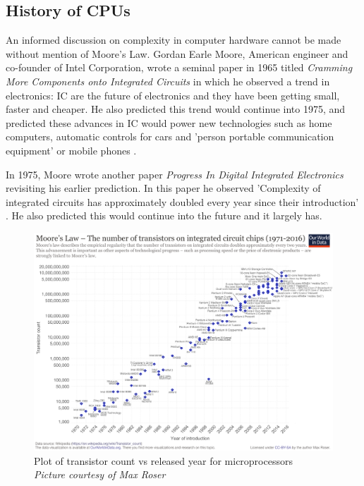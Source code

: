\subsection{History of CPUs}
An informed discussion on complexity in computer hardware cannot be made without mention of Moore's Law.  Gordan Earle Moore, American engineer and co-founder of Intel Corporation, wrote a seminal paper in 1965 titled \textit{Cramming  More  Components  onto Integrated  Circuits} in which he observed a trend in electronics: IC are the future of electronics and they have been getting small, faster and cheaper. He also predicted this trend would continue into 1975, and predicted these advances in IC would power new technologies such as home computers, automatic controls for cars and 'person portable communication equipment' or mobile phones \cite{moore65}.

In 1975, Moore wrote another paper \textit{Progress In Digital Integrated Electronics} revisiting his earlier prediction. In this paper he observed 'Complexity of integrated circuits has approximately doubled every year since their introduction' \cite{moore75}. He also predicted this would continue into the future and it largely has. 

\begin{figure} \begin{center}
\includegraphics[width=1\linewidth]{pics/moore_law} 
\end{center} 
\caption{Plot of transistor count vs released year for microprocessors\\ \textit{\small{Picture courtesy of  Max Roser}}}
\end{figure}

